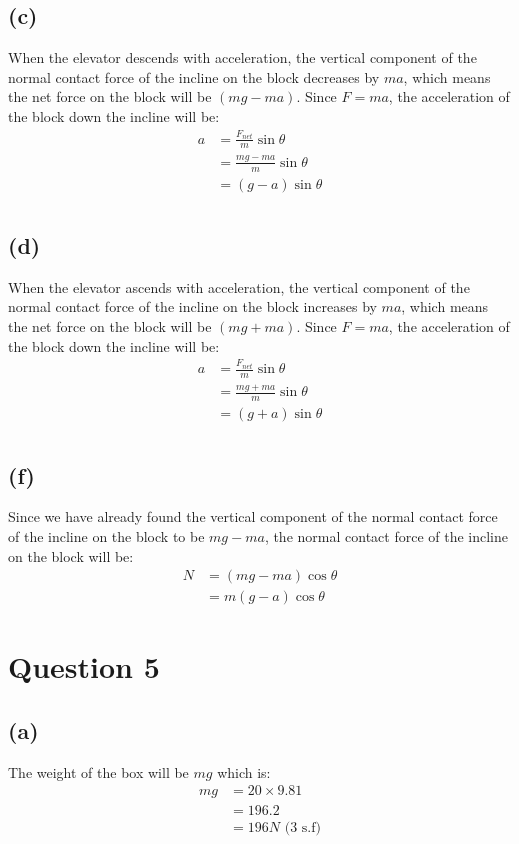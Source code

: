 \documentclass[11pt]{article}
\begin{document}
\subsection{(c)}
\label{sec:orgbcab712}
When the elevator descends with acceleration, the vertical component of the normal contact force of the incline on the block decreases by \(ma\), which means the net force on the block will be \((mg - ma)\). Since \(F = ma\), the acceleration of the block down the incline will be:
\begin{align*}
a &= \frac{F_{net}}{m} \sin \theta \\
&= \frac{mg - ma}{m} \sin \theta \\
&= (g - a) \sin \theta \\
\end{align*}

\subsection{(d)}
\label{sec:orgd65eda7}
When the elevator ascends with acceleration, the vertical component of the normal contact force of the incline on the block increases by \(ma\), which means the net force on the block will be \((mg + ma)\). Since \(F = ma\), the acceleration of the block down the incline will be:
\begin{align*}
a &= \frac{F_{net}}{m} \sin \theta \\
&= \frac{mg + ma}{m} \sin \theta \\
&= (g + a) \sin \theta \\
\end{align*}

\subsection{(f)}
\label{sec:org1beb01d}
Since we have already found the vertical component of the normal contact force of the incline on the block to be \(mg - ma\), the normal contact force of the incline on the block will be:
\begin{align*}
N &= (mg - ma) \cos \theta \\
&= m(g - a) \cos \theta
\end{align*}

\section{Question 5}
\label{sec:orgc07145e}

\subsection{(a)}
\label{sec:orge8c52b2}
The weight of the box will be \(mg\) which is:
\begin{align*}
mg &= 20 \times 9.81 \\
&= 196.2 \\
&= 196 \si{N} \text{ (3 s.f)}
\end{align*}
\end{document}
